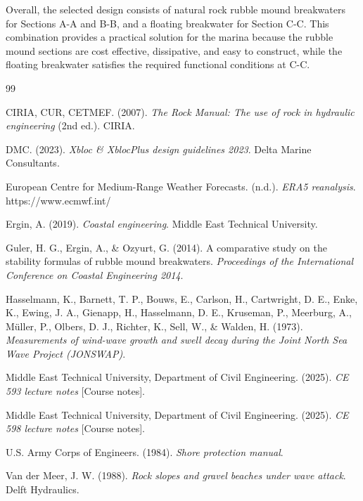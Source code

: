 \documentclass[a4paper, 11pt]{article}
\begin{document}
Overall, the selected design consists of natural rock rubble mound breakwaters for Sections A-A and B-B, and a floating breakwater for Section C-C. This combination provides a practical solution for the marina because the rubble mound sections are cost effective, dissipative, and easy to construct, while the floating breakwater satisfies the required functional conditions at C-C.


\newpage


\begin{thebibliography}{99}

CIRIA, CUR, CETMEF. (2007). \textit{The Rock Manual: The use of rock in hydraulic engineering} (2nd ed.). CIRIA.

DMC. (2023). \textit{Xbloc \& XblocPlus design guidelines 2023}. Delta Marine Consultants.

European Centre for Medium-Range Weather Forecasts. (n.d.). \textit{ERA5 reanalysis}. https://www.ecmwf.int/

Ergin, A. (2019). \textit{Coastal engineering}. Middle East Technical University.

Guler, H. G., Ergin, A., \& Ozyurt, G. (2014). A comparative study on the stability formulas of rubble mound breakwaters. \textit{Proceedings of the International Conference on Coastal Engineering 2014}.

Hasselmann, K., Barnett, T. P., Bouws, E., Carlson, H., Cartwright, D. E., Enke, K., Ewing, J. A., Gienapp, H., Hasselmann, D. E., Kruseman, P., Meerburg, A., M\"uller, P., Olbers, D. J., Richter, K., Sell, W., \& Walden, H. (1973). \textit{Measurements of wind-wave growth and swell decay during the Joint North Sea Wave Project (JONSWAP)}.

Middle East Technical University, Department of Civil Engineering. (2025). \textit{CE 593 lecture notes} [Course notes].

Middle East Technical University, Department of Civil Engineering. (2025). \textit{CE 598 lecture notes} [Course notes].

U.S. Army Corps of Engineers. (1984). \textit{Shore protection manual}.

Van der Meer, J. W. (1988). \textit{Rock slopes and gravel beaches under wave attack}. Delft Hydraulics.


\end{thebibliography}
\end{document}
